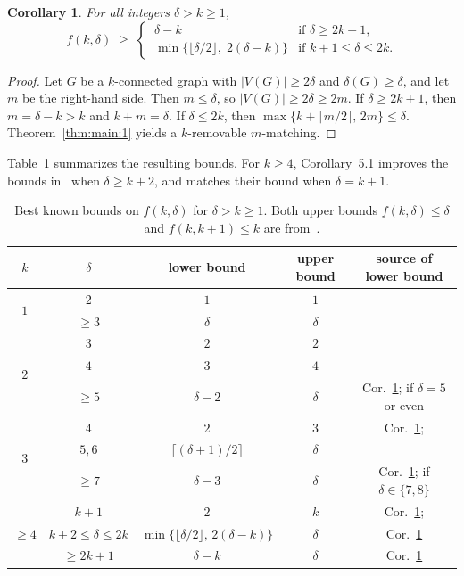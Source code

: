 \documentclass[11pt]{article}
\numberwithin{equation}{section}
\newtheorem{corollary}[theorem]{Corollary}
\begin{document}
\begin{corollary}\label{cor:f-bound}
For all integers $\delta > k \ge 1$,
\[
f(k,\delta) \;\ge\;
\begin{cases}
\ \delta-k & \text{if } \delta \ge 2k+1,\\[4pt]
\ \min\bigl\{\lfloor \delta/2 \rfloor,\; 2(\delta-k)\bigr\} & \text{if } k+1 \le \delta \le 2k.
\end{cases}
\]
\end{corollary}

\begin{proof}
Let $G$ be a $k$-connected graph with $|V(G)| \ge 2\delta$ and $\delta(G) \ge \delta$,
and let $m$ be the right-hand side. Then $m \le \delta$, so $|V(G)| \ge 2\delta \ge 2m$.
If $\delta \ge 2k+1$, then $m = \delta-k > k$ and $k+m = \delta$. If $\delta \le 2k$,
then $\max\{k+\lceil m/2 \rceil,\, 2m\} \le \delta$. 
Theorem~\ref{thm:main:1} yields a $k$-removable $m$-matching.
\end{proof}

Table~\ref{tab:f} summarizes the resulting bounds. 
For $k\ge 4$, Corollary~5.1 improves the bounds in~\cite{lzfm}
when $\delta\ge k+2$, and matches their bound when $\delta=k+1$.
\begin{table}[H]
\centering
\begin{tabular}{c|c||c|c|c}
\hline
$k$ & $\delta$ & lower bound & upper bound & source of lower bound \\
\hline
\hline
\multirow{2}{*}{$1$} & $2$ & $1$ & $1$ & \cite{halin} \\
  & $\ge 3$ & $\delta$ & $\delta$ & \cite{lzfm} \\
\hline
\multirow{3}{*}{$2$} & $3$ & $2$ & $2$ & \cite{lzfm} \\
 & $4$ & $3$  & $4$ & \cite{lzfm} \\
 & $\ge 5$ & $\delta-2$ & $\delta$ & Cor.~\ref{cor:f-bound}; \cite{lzfm} if $\delta=5$ or even \\
\hline
\multirow{3}{*}{$3$} & $4$ & $2$ & $3$ & Cor.~\ref{cor:f-bound};\cite{lzfm} \\
 & $5,6$ & $\lceil (\delta+1)/2 \rceil$ & $\delta$ & \cite{lzfm} \\
 & $\ge 7$ & $\delta-3$ & $\delta$ & Cor.~\ref{cor:f-bound};  \cite{lzfm} if $\delta \in \{7,8\}$ \\
\hline
\multirow{3}{*}{$\ge 4$} & $k+1$ & $2$ & $k$ & Cor.~\ref{cor:f-bound}; \cite{lzfm} \\
 & $k+2 \le \delta \le 2k$ & $\min\{\lfloor \delta/2 \rfloor,\, 2(\delta-k)\}$ & $\delta$ & Cor.~\ref{cor:f-bound} \\
 & $\ge 2k+1$ & $\delta-k$ & $\delta$ & Cor.~\ref{cor:f-bound} \\
\hline
\end{tabular}
\caption{Best known bounds on $f(k,\delta)$ for $\delta > k \ge 1$. Both upper bounds
$f(k,\delta) \le \delta$ and $f(k,k+1) \le k$ are from~\cite{lzfm}.}
\label{tab:f}
\end{table}
\end{document}
